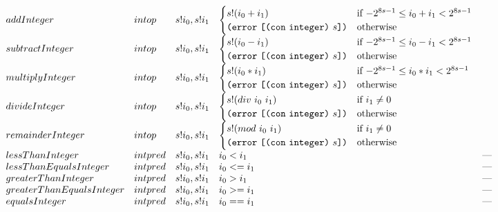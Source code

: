 \documentclass[../main.tex]{subfiles}
\begin{document}
\begin{figure*}[t]
\[\begin{array}{lllll}
        addInteger        &  intop  &  s!i_0 , s!i_1   & \begin{cases}
          s!(i_0 + i_1)                     & \text{if $-2^{8s-1} \leq i_0 + i_1 < 2^{8s-1}$}\\
          \texttt{(} \texttt{error} ~ \texttt{[} \texttt{(} \texttt{con} ~ \texttt{integer} \texttt{)} ~ s \texttt{]} \texttt{)}  & \text{otherwise}\\
        \end{cases} \\
        subtractInteger   &  intop  &  s!i_0 , s!i_1 & \begin{cases}
          s!(i_0 - i_1)                     & \text{if $-2^{8s-1} \leq i_0 - i_1 < 2^{8s-1}$}\\
          \texttt{(} \texttt{error} ~ \texttt{[} \texttt{(} \texttt{con} ~ \texttt{integer} \texttt{)} ~ s \texttt{]} \texttt{)}  & \text{otherwise}\\
        \end{cases} \\
        multiplyInteger   &  intop  &  s!i_0 , s!i_1   & \begin{cases}
          s!(i_0 * i_1)                     & \text{if $-2^{8s-1} \leq i_0 * i_1 < 2^{8s-1}$}\\
          \texttt{(} \texttt{error} ~ \texttt{[} \texttt{(} \texttt{con} ~ \texttt{integer} \texttt{)} ~ s \texttt{]} \texttt{)}  & \text{otherwise}\\
        \end{cases} \\
        divideInteger     &  intop  &  s!i_0 , s!i_1   & \begin{cases}
          s!(div ~ i_0 ~ i_1)                     & \text{if $i_1 \not= 0$}\\
          \texttt{(} \texttt{error} ~ \texttt{[} \texttt{(} \texttt{con} ~ \texttt{integer} \texttt{)} ~ s \texttt{]} \texttt{)}  & \text{otherwise}
        \end{cases}\\
        remainderInteger  &  intop  &  s!i_0 , s!i_1   & \begin{cases}
          s!(mod ~ i_0 ~ i_1)                     & \text{if $i_1 \not= 0$}\\
          \texttt{(} \texttt{error} ~ \texttt{[} \texttt{(} \texttt{con} ~ \texttt{integer} \texttt{)} ~ s \texttt{]} \texttt{)}  & \text{otherwise}
        \end{cases}\\
        
        lessThanInteger            &  intpred  &  s!i_0 , s!i_1   &   i_0 < i_1    &   \textrm{---}         \\
        lessThanEqualsInteger      &  intpred  &  s!i_0 , s!i_1   &   i_0 <= i_1   &   \textrm{---}         \\
        greaterThanInteger         &  intpred  &  s!i_0 , s!i_1   &   i_0 > i_1    &   \textrm{---}         \\
        greaterThanEqualsInteger   &  intpred  &  s!i_0 , s!i_1   &   i_0 >= i_1   &   \textrm{---}         \\
        equalsInteger              &  intpred  &  s!i_0 , s!i_1   &   i_0 == i_1   &   \textrm{---}         \\
        

\end{array}\]
\end{figure*}
\end{document}
